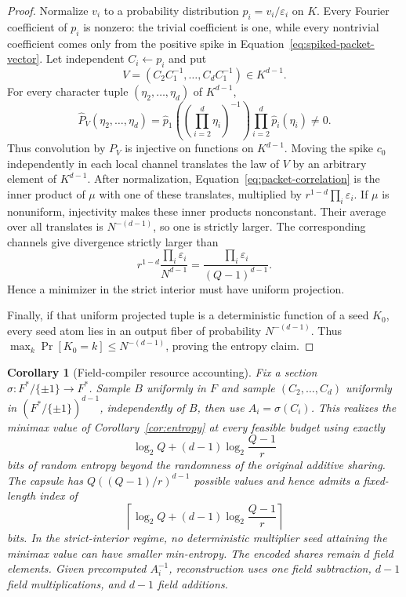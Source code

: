 \documentclass[11pt]{article}
\newtheorem{corollary}[theorem]{Corollary}
\theoremstyle{definition}
\begin{document}
\begin{proof}
Normalize $v_i$ to a probability distribution $p_i=v_i/\varepsilon_i$ on
$K$.  Every Fourier coefficient of $p_i$ is nonzero: the trivial coefficient
is one, while every nontrivial coefficient comes only from the positive spike
in Equation~\eqref{eq:spiked-packet-vector}.  Let independent
$C_i\leftarrow p_i$ and put
\[
 V=(C_2C_1^{-1},\ldots,C_dC_1^{-1})\in K^{d-1}.
\]
For every character tuple $(\eta_2,\ldots,\eta_d)$ of $K^{d-1}$,
\[
 \widehat P_V(\eta_2,\ldots,\eta_d)
 =\widehat p_1\left((\textstyle\prod_{i=2}^d\eta_i)^{-1}\right)
    \prod_{i=2}^d\widehat p_i(\eta_i)\neq0.
\]
Thus convolution by $P_V$ is injective on functions on $K^{d-1}$.
Moving the spike $c_0$ independently in each local channel translates the law
of $V$ by an arbitrary element of $K^{d-1}$.  After normalization,
Equation~\eqref{eq:packet-correlation} is the inner product of $\mu$ with one
of these translates, multiplied by
$r^{1-d}\prod_i\varepsilon_i$.  If $\mu$ is nonuniform, injectivity makes
these inner products nonconstant.  Their average over all translates is
$N^{-(d-1)}$, so one is strictly larger.  The corresponding channels give
divergence strictly larger than
\[
 r^{1-d}\frac{\prod_i\varepsilon_i}{N^{d-1}}
 =\frac{\prod_i\varepsilon_i}{(Q-1)^{d-1}}.
\]
Hence a minimizer in the strict interior must have uniform projection.

Finally, if that uniform projected tuple is a deterministic function of a seed
$K_0$, every seed atom lies in an output fiber of probability $N^{-(d-1)}$.
Thus $\max_k\Pr[K_0=k]\leq N^{-(d-1)}$, proving the entropy claim.
\end{proof}

\begin{corollary}[Field-compiler resource accounting]\label{cor:resources}
Fix a section $\sigma:F^*/\{\pm1\}\to F^*$.  Sample $B$ uniformly in $F$ and
sample $(C_2,\ldots,C_d)$ uniformly in
$(F^*/\{\pm1\})^{d-1}$, independently of $B$, then use
$A_i=\sigma(C_i)$.  This realizes the minimax value of
Corollary~\ref{cor:entropy} at every feasible budget using exactly
\[
 \log_2 Q+(d-1)\log_2\frac{Q-1}{r}
\]
bits of random entropy beyond the randomness of the original additive sharing.
The capsule has $Q((Q-1)/r)^{d-1}$ possible values and hence admits a
fixed-length index of
\[
 \left\lceil\log_2 Q+(d-1)\log_2\frac{Q-1}{r}\right\rceil
\]
bits.  In the strict-interior regime, no deterministic multiplier seed attaining
the minimax value can have smaller min-entropy.  The encoded shares remain $d$
field elements.  Given precomputed $A_i^{-1}$, reconstruction uses one field
subtraction, $d-1$ field multiplications, and $d-1$ field additions.
\end{corollary}
\end{document}
